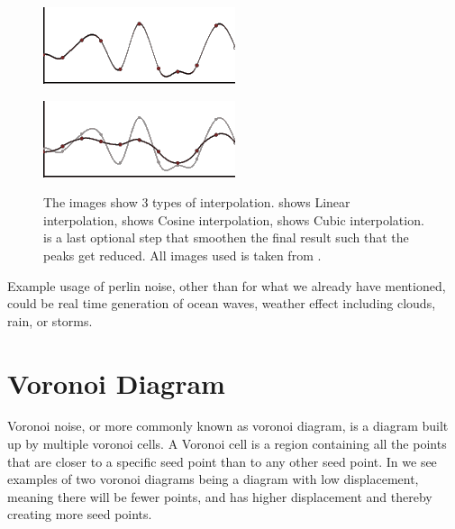 \begin{figure}[H]
\begin{minipage}[b]{.5\linewidth}
	\end{minipage}
	\begin{minipage}[b]{.5\linewidth}
		\includegraphics[width=0.95\linewidth]{img/m_inter4}
		\label{fig:1c}
	\end{minipage}%
	\begin{minipage}[b]{.5\linewidth}
		\includegraphics[width=0.95\linewidth]{img/m_inter6}
		\label{fig:1d}
	\end{minipage}%

	\centering
	\caption{The images show 3 types of interpolation.  shows Linear interpolation,  shows Cosine interpolation,  shows Cubic interpolation.  is a last optional step that smoothen the final result such that the peaks get reduced. All images used is taken from \cite{perlinnoise2}.}
	\label{fig:interpolation}
\end{figure}

Example usage of perlin noise, other than for what we already have mentioned, could be real time generation of ocean waves, weather effect including clouds, rain, or storms.


\section{Voronoi Diagram}
\label{VoronoiDiagram}
Voronoi noise, or more commonly known as voronoi diagram, is a diagram built up by multiple voronoi cells. A Voronoi cell is a region containing all the points that are closer to a specific seed point than to any other seed point\cite{libnoiseVoronoi}. In  we see examples of two voronoi diagrams  being a diagram with low displacement, meaning there will be fewer points, and  has higher displacement and thereby creating more seed points.

